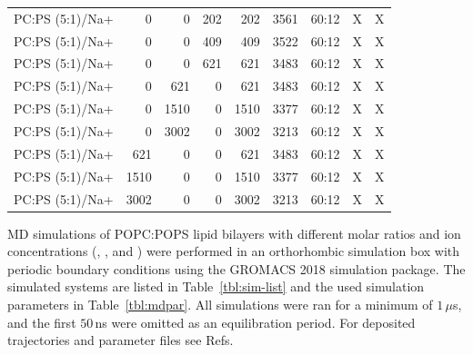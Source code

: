\documentclass[journal=jpcbfk,manuscript=article]{achemso}
\begin{document}
\begin{table}[tbp]
\begin{tabular}{l | r r r r | r r | c c }
PC:PS (5:1)/Na+  &      0  &      0  &    202  &    202  &  3561  &  60:12  &  X  &  X  \\ 
PC:PS (5:1)/Na+  &      0  &      0  &    409  &    409  &  3522  &  60:12  &  X  &  X  \\ 
PC:PS (5:1)/Na+  &      0  &      0  &    621  &    621  &  3483  &  60:12  &  X  &  X  \\ 
PC:PS (5:1)/Na+  &      0  &    621  &      0  &    621  &  3483  &  60:12  &  X  &  X  \\ 
PC:PS (5:1)/Na+  &      0  &   1510  &      0  &   1510  &  3377  &  60:12  &  X  &  X  \\ 
PC:PS (5:1)/Na+  &      0  &   3002  &      0  &   3002  &  3213  &  60:12  &  X  &  X  \\ 
PC:PS (5:1)/Na+  &    621  &      0  &      0  &    621  &  3483  &  60:12  &  X  &  X  \\ 
PC:PS (5:1)/Na+  &   1510  &      0  &      0  &   1510  &  3377  &  60:12  &  X  &  X  \\ 
PC:PS (5:1)/Na+  &   3002  &      0  &      0  &   3002  &  3213  &  60:12  &  X  &  X  \\ 
  \hline
\end{tabular}
\end{table}


MD simulations of POPC:POPS lipid bilayers with different molar ratios 
and ion concentrations (, ,  and )
were performed in an orthorhombic simulation box with periodic boundary conditions
using the GROMACS 2018 \cite{Abraham15} simulation package. 
The simulated systems are listed in Table~\ref{tbl:sim-list}
and the used simulation parameters in Table~\ref{tbl:mdpar}. 
All simulations were ran for a minimum of $1 \, \mu$s,
and the first  $50 \,$ns were omitted as an equilibration period. 
For deposited trajectories and parameter files see 
Refs.~
\end{document}
